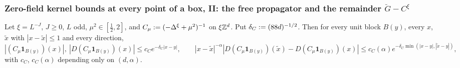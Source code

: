 
\subsubsection{Zero-field kernel bounds at every point of a box, II: the free propagator and the remainder $\breve G-C^\xi$}\label{sup4:ssec:zeroB}

\begin{lemma}\label{sup4:lem:C1}
Let $\xi=L^{-J}$, $J\ge0$, $L$ odd, $\mu^2\in[\frac12,2]$, and $C_\mu:=(-\Delta^\xi+\mu^2)^{-1}$ on $\xi\mathbb Z^d$. Put $\delta_C:=(88d)^{-1/2}$. Then for every unit block $B(y)$, every $x$, $\tilde x$ with $|x-\tilde x|\le1$ and every direction,
\[
|(C_\mu\mathbf 1_{B(y)})(x)|,\ |D(C_\mu\mathbf 1_{B(y)})(x)|\le c_Ce^{-\delta_C|x-y|},\qquad |x-\tilde x|^{-\alpha}|D(C_\mu\mathbf 1_{B(y)})(\tilde x)-D(C_\mu\mathbf 1_{B(y)})(x)|\le c_C(\alpha)e^{-\delta_C\min(|x-y|,|\tilde x-y|)},
\]
with $c_C$, $c_C(\alpha)$ depending only on $(d,\alpha)$.
\end{lemma}

